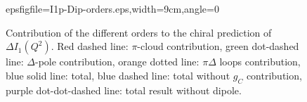 \documentclass[prc,twocolumn,showpacs,preprintnumbers,amsmath,amssymb
,superscriptaddress,a4paper,nofootinbib
]{revtex4-1}
\begin{document}
\begin{figure}[t]
\begin{center}
\hspace{-0.3cm}epsfig{file=I1p-Dip-orders.eps,width=9cm,angle=0}\\ \hspace{-0.3cm} 
\caption{Contribution of the different orders to the chiral prediction of $\Delta I_1(Q^2)$. Red dashed line: $\pi$-cloud contribution, green dot-dashed line: $\Delta$-pole contribution, orange dotted line: $\pi \Delta$ loops contribution, blue solid line: total, blue dashed line: total without $g_C$ contribution, purple dot-dot-dashed line: total result without dipole. \label{Fig:I1-orders-plot}}
\end{center}
\end{figure}





\end{document}
